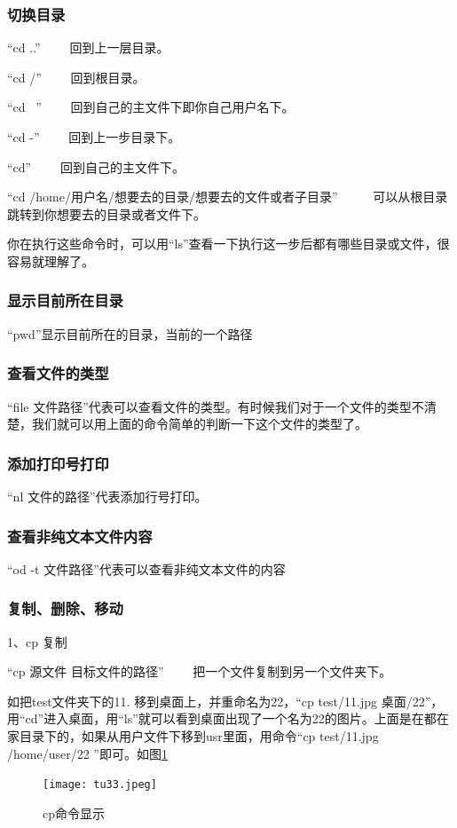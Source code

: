 \documentclass{article}
\begin{document}
\subsubsection{切换目录}
“cd ..” ~~~~回到上一层目录。

“cd /”  ~~~~回到根目录。

“cd ~”  ~~~~回到自己的主文件下即你自己用户名下。

“cd -”  ~~~~回到上一步目录下。

“cd”    ~~~~回到自己的主文件下。

“cd /home/用户名/想要去的目录/想要去的文件或者子目录”  ~~~~~可以从根目录跳转到你想要去的目录或者文件下。

你在执行这些命令时，可以用“ls”查看一下执行这一步后都有哪些目录或文件，很容易就理解了。
\subsubsection{显示目前所在目录}

“pwd”显示目前所在的目录，当前的一个路径


\subsubsection{查看文件的类型}
“file 文件路径”代表可以查看文件的类型。有时候我们对于一个文件的类型不清楚，我们就可以用上面的命令简单的判断一下这个文件的类型了。
\subsubsection{添加打印号打印}
“nl 文件的路径”代表添加行号打印。
\subsubsection{查看非纯文本文件内容} 
“od -t 文件路径”代表可以查看非纯文本文件的内容
\subsubsection{复制、删除、移动}
1、cp 复制

“cp 源文件 目标文件的路径”  ~~~~把一个文件复制到另一个文件夹下。

如把test文件夹下的11. 移到桌面上，并重命名为22，“cp test/11.jpg 桌面/22”，用“cd”进入桌面，用“ls”就可以看到桌面出现了一个名为22的图片。上面是在都在家目录下的，如果从用户文件下移到usr里面，用命令“cp test/11.jpg /home/user/22 ”即可。如图\ref{tu33}
\begin{figure}[!htb] %
\centering
\texttt{[image: tu33.jpeg]}
\caption{\small cp命令显示}
\label{tu33}
\end{figure} 
\end{document}
